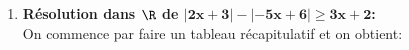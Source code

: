 \begin{correction}
\begin{enumerate}
\item \textbf{R\'esolution dans $\mathbf{\R}$ de $\mathbf{|2x+3|-|-5x+6|\geq 3x+2}$:}\\
\noindent On commence par faire un tableau r\'ecapitulatif et on obtient:
\begin{center}
\begin{tikzpicture}

\end{tikzpicture}
\end{center}
\end{enumerate}
\end{correction}
